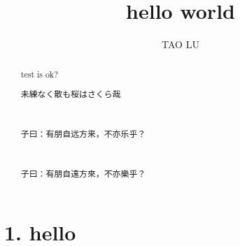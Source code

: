 \documentclass[a4paper,11pt]{report}
\title{hello world}
\author{TAO LU}
\begin{document}
\maketitle
\tableofcontents

\begin{abstract}
test is ok?\\
\begin{CJK}{UTF8}{min}未練なく散も桜はさくら哉\end{CJK}\\
\begin{CJK}{UTF8}{gbsn}子曰：有朋自远方来，不亦乐乎？\end{CJK}\\
\begin{CJK}{UTF8}{bsmi}子曰：有朋自遠方來，不亦樂乎？\end{CJK}
\end{abstract}

\chapter{1. hello}
\end{document}
